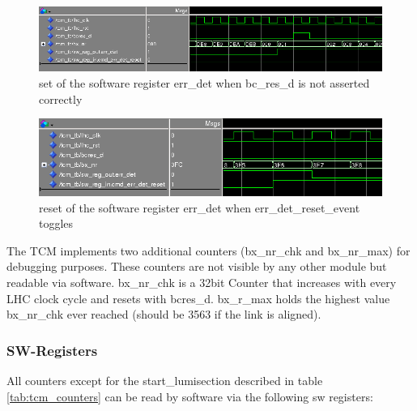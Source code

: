 \begin{figure}[ht]
  \includegraphics[width=1.0\textwidth]{./figures/err_det}
  \caption{set of the software register err\_det when bc\_res\_d is not asserted correctly}
  \label{fig:err_det}
\end{figure}

\begin{figure}[ht]
  \includegraphics[width=1.0\textwidth]{./figures/err_det_reset}
  \caption{reset of the software register err\_det when err\_det\_reset\_event toggles}
  \label{fig:err_det_reset}
\end{figure}

The TCM implements two additional counters (bx\_nr\_chk and bx\_nr\_max) for debugging purposes. These counters are not visible by any other module but readable via software. bx\_nr\_chk is a 32bit Counter that increases with every LHC clock cycle and resets with bcres\_d. bx\_r\_max holds the highest value bx\_nr\_chk ever reached (should be 3563 if the link is aligned).

\subsubsection{SW-Registers}
All counters except for the start\_lumisection described in table \ref{tab:tcm_counters} can be read by software via the following sw registers:

